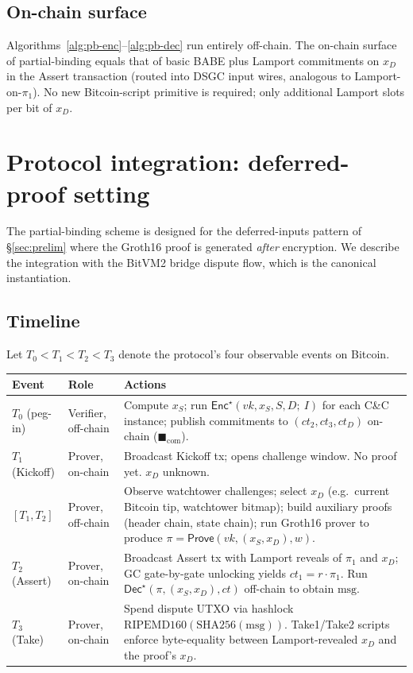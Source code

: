 \documentclass[11pt]{article}
\newcommand{\msg}{\mathrm{msg}}
\newcommand{\Enc}{\mathsf{Enc}}
\newcommand{\Dec}{\mathsf{Dec}}
\begin{document}
\subsection{On-chain surface}

Algorithms~\ref{alg:pb-enc}--\ref{alg:pb-dec} run entirely off-chain.
The on-chain surface of partial-binding equals that of basic BABE
plus Lamport commitments on $x_D$ in the Assert transaction (routed
into DSGC input wires, analogous to Lamport-on-$\pi_1$). No new
Bitcoin-script primitive is required; only additional Lamport slots
per bit of $x_D$.

\section{Protocol integration: deferred-proof setting}\label{sec:protocol}

The partial-binding scheme is designed for the deferred-inputs
pattern of \S\ref{sec:prelim} where the Groth16 proof is generated
\emph{after} encryption. We describe the integration with the BitVM2
bridge dispute flow, which is the canonical instantiation.

\subsection{Timeline}

Let $T_0 < T_1 < T_2 < T_3$ denote the protocol's four observable
events on Bitcoin.

\begin{center}\small
\renewcommand{\arraystretch}{1.25}
\begin{tabular}{@{}l p{4.0cm} p{7.2cm}@{}}
\toprule
\textbf{Event} & \textbf{Role} & \textbf{Actions} \\
\midrule
$T_0$ (peg-in) & Verifier, off-chain & Compute $x_S$; run
$\Enc^\star(vk, x_S, S, D;\ I)$ for each C\&C instance; publish
commitments to $(ct_2, ct_3, ct_D)$ on-chain ($\blacksquare_{\mathrm{com}}$). \\
$T_1$ (Kickoff) & Prover, on-chain & Broadcast Kickoff tx; opens
challenge window. No proof yet. $x_D$ unknown. \\
$[T_1, T_2]$ & Prover, off-chain & Observe watchtower challenges;
select $x_D$ (e.g.\ current Bitcoin tip, watchtower bitmap); build
auxiliary proofs (header chain, state chain); run Groth16 prover to
produce $\pi = \mathsf{Prove}(vk, (x_S, x_D), w)$. \\
$T_2$ (Assert) & Prover, on-chain & Broadcast Assert tx with Lamport
reveals of $\pi_1$ and $x_D$; GC gate-by-gate unlocking yields
$ct_1 = r \cdot \pi_1$. Run $\Dec^\star(\pi, (x_S, x_D), ct)$
off-chain to obtain $\msg$. \\
$T_3$ (Take) & Prover, on-chain & Spend dispute UTXO via hashlock
$\mathrm{RIPEMD160}(\mathrm{SHA256}(\msg))$. Take1/Take2 scripts
enforce byte-equality between Lamport-revealed $x_D$ and the proof's
$x_D$. \\
\bottomrule
\end{tabular}
\end{center}
\end{document}
